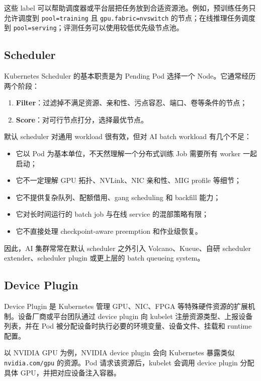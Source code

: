这些 label 可以帮助调度器或平台层把任务放到合适资源池。例如，预训练任务只允许调度到 \texttt{pool=training} 且 \texttt{gpu.fabric=nvswitch} 的节点；在线推理任务调度到 \texttt{pool=serving}；评测任务可以使用较低优先级节点池。

\subsection{Scheduler}
\label{subsec:scheduler}

Kubernetes Scheduler 的基本职责是为 Pending Pod 选择一个 Node。它通常经历两个阶段：

\begin{enumerate}
  \item \textbf{Filter}：过滤掉不满足资源、亲和性、污点容忍、端口、卷等条件的节点；
  \item \textbf{Score}：对可行节点打分，选择最优节点。
\end{enumerate}

默认 scheduler 对通用 workload 很有效，但对 AI batch workload 有几个不足：

\begin{itemize}
  \item 它以 Pod 为基本单位，不天然理解一个分布式训练 Job 需要所有 worker 一起启动；
  \item 它不一定理解 GPU 拓扑、NVLink、NIC 亲和性、MIG profile 等细节；
  \item 它不提供复杂队列、配额借用、gang scheduling 和 backfill 能力；
  \item 它对长时间运行的 batch job 与在线 service 的混部策略有限；
  \item 它不直接处理 checkpoint-aware preemption 和作业级恢复。
\end{itemize}

因此，AI 集群常常在默认 scheduler 之外引入 Volcano、Kueue、自研 scheduler extender、scheduler plugin 或更上层的 batch queueing system。

\subsection{Device Plugin}
\label{subsec:device-plugin}

Device Plugin 是 Kubernetes 管理 GPU、NIC、FPGA 等特殊硬件资源的扩展机制。设备厂商或平台团队通过 device plugin 向 kubelet 注册资源类型、上报设备列表，并在 Pod 被分配设备时执行必要的环境变量、设备文件、挂载和 runtime 配置。

以 NVIDIA GPU 为例，NVIDIA device plugin 会向 Kubernetes 暴露类似 \texttt{nvidia.com/gpu} 的资源。Pod 请求该资源后，kubelet 会调用 device plugin 分配具体 GPU，并把对应设备注入容器。

